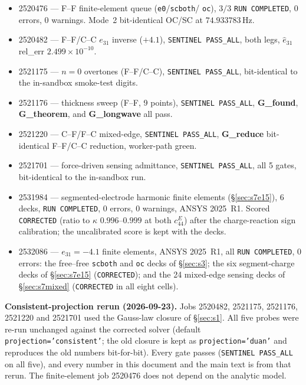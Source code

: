 \documentclass[11pt]{article}
\begin{document}
\begin{itemize}
\item 2520476 --- F--F finite-element queue (\texttt{e0}/\texttt{scboth}/
      \texttt{oc}), $3/3$ \texttt{RUN COMPLETED}, 0 errors, 0 warnings.
      Mode~2 bit-identical OC/SC at $74.933783\,\mathrm{Hz}$.
\item 2520482 --- F--F/C--C $e_{31}$ inverse ($+4.1$), \texttt{SENTINEL
      PASS\_ALL}, both legs, $\hat e_{31}$ rel\_err $2.499\times10^{-10}$.
\item 2521175 --- $n=0$ overtones (F--F/C--C), \texttt{SENTINEL
      PASS\_ALL}, bit-identical to the in-sandbox smoke-test digits.
\item 2521176 --- thickness sweep (F--F, 9 points), \texttt{SENTINEL
      PASS\_ALL}, \textbf{G\_found}, \textbf{G\_theorem}, and
      \textbf{G\_longwave} all pass.
\item 2521220 --- C--F/F--C mixed-edge, \texttt{SENTINEL PASS\_ALL},
      \textbf{G\_reduce} bit-identical F--F/C--C reduction, worker-path green.
\item 2521701 --- force-driven sensing admittance, \texttt{SENTINEL
      PASS\_ALL}, all 5 gates, bit-identical to the in-sandbox run.
\item 2531984 --- segmented-electrode harmonic finite elements
      (\S\ref{sec:s7e15}), 6 decks, \texttt{RUN COMPLETED}, 0 errors, 0
      warnings, ANSYS 2025~R1. Scored \texttt{CORRECTED} (ratio to $\kappa$
      $0.996$--$0.999$ at both $c_{44}^E$) after the charge-reaction sign
      calibration; the uncalibrated score is kept with the decks.
\item 2532086 --- $e_{31}=-4.1$ finite elements, ANSYS 2025~R1, all
      \texttt{RUN COMPLETED}, 0 errors: the free--free \texttt{scboth}
      and \texttt{oc} decks of \S\ref{sec:s3}; the six segment-charge
      decks of \S\ref{sec:s7e15} (\texttt{CORRECTED}); and the 24
      mixed-edge sensing decks of \S\ref{sec:s7mixed}
      (\texttt{CORRECTED} in all eight cells).
\end{itemize}
\noindent\textbf{Consistent-projection rerun (2026-09-23).} Jobs
2520482, 2521175, 2521176, 2521220 and 2521701 used the Gauss-law
closure of \S\ref{sec:s1}. All five probes were re-run unchanged
against the corrected solver (default \texttt{projection='consistent'};
the old closure is kept as \texttt{projection='duan'} and reproduces the
old numbers bit-for-bit). Every gate passes (\texttt{SENTINEL PASS\_ALL}
on all five), and every number in this document and the main text is
from that rerun. The finite-element job 2520476 does not depend on
the analytic model.
\end{document}
